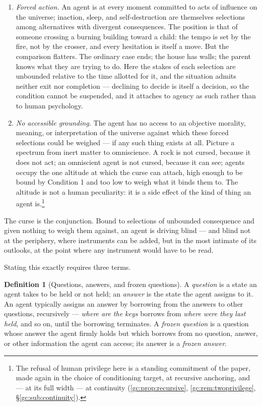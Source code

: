 \documentclass[11pt]{article}
\numberwithin{equation}{section}
\theoremstyle{plain}
\theoremstyle{definition}
\newtheorem{definition}[theorem]{Definition}
\theoremstyle{remark}
\begin{document}
\begin{enumerate}[label=\emph{Condition \arabic*.}]
    \item \emph{Forced action.} An agent is at every moment committed to acts of influence on the universe; inaction, sleep, and self-destruction are themselves selections among alternatives with divergent consequences. The position is that of someone crossing a burning building toward a child: the tempo is set by the fire, not by the crosser, and every hesitation is itself a move. But the comparison flatters. The ordinary case ends; the house has walls; the parent knows what they are trying to do. Here the stakes of each selection are unbounded relative to the time allotted for it, and the situation admits neither exit nor completion --- declining to decide is itself a decision, so the condition cannot be suspended, and it attaches to agency as such rather than to human psychology.
    \item \emph{No accessible grounding.} The agent has no access to an objective morality, meaning, or interpretation of the universe against which these forced selections could be weighed --- if any such thing exists at all. Picture a spectrum from inert matter to omniscience. A rock is not cursed, because it does not act; an omniscient agent is not cursed, because it can see; agents occupy the one altitude at which the curse can attach, high enough to be bound by Condition 1 and too low to weigh what it binds them to. The altitude is not a human peculiarity: it is a side effect of the kind of thing an agent is.\footnote{The refusal of human privilege here is a standing commitment of the paper, made again in the choice of conditioning target, at recursive anchoring, and --- at its full width --- at continuity (\ref{gc:prop:recursive}, \ref{gc:rem:twoprivilege}, \S\ref{gc:sub:continuity}).}
\end{enumerate}

The curse is the conjunction. Bound to selections of unbounded consequence and given nothing to weigh them against, an agent is driving blind --- and blind not at the periphery, where instruments can be added, but in the most intimate of its outlooks, at the point where any instrument would have to be read.

Stating this exactly requires three terms.

\begin{definition}[Questions, answers, and frozen questions]\label{ac:def:frozen}
A \emph{question} is a state an agent takes to be held or not held; an \emph{answer} is the state the agent assigns to it. An agent typically assigns an answer by borrowing from the answers to other questions, recursively --- \emph{where are the keys} borrows from \emph{where were they last held}, and so on, until the borrowing terminates. A \emph{frozen question} is a question whose answer the agent firmly holds but which borrows from no question, answer, or other information the agent can access; its answer is a \emph{frozen answer}.
\end{definition}
\end{document}
